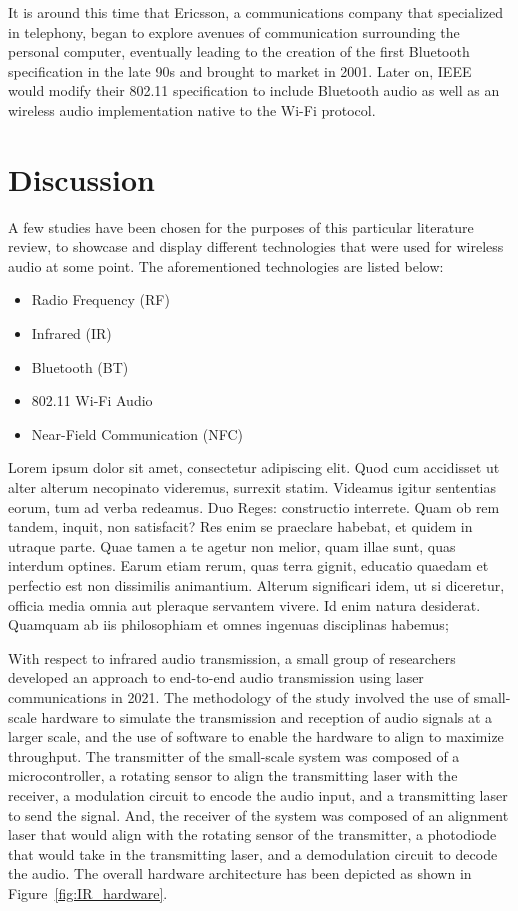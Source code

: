 \documentclass[conference]{IEEEtran}
\begin{document}
It is around this time that Ericsson, a communications company that specialized in telephony,
began to explore avenues of communication surrounding the personal computer, eventually
leading to the creation of the first Bluetooth specification in the late 90s and brought to
market in 2001.\cite{irekvist_bluetooth_2022} Later on, IEEE would modify their 802.11
specification to include Bluetooth audio as well as an wireless audio implementation native
to the Wi-Fi protocol.\cite{noauthor_bluetooth_nodate}

\section*{Discussion}

A few studies have been chosen for the purposes of this particular literature review, to
showcase and display different technologies that were used for wireless audio at some point.
The aforementioned technologies are listed below:

\begin{itemize}
    \item Radio Frequency (RF)
    \item Infrared (IR)
    \item Bluetooth (BT)
    \item 802.11 Wi-Fi Audio
    \item Near-Field Communication (NFC)
\end{itemize}

Lorem ipsum dolor sit amet, consectetur adipiscing elit. Quod cum accidisset ut alter alterum
necopinato videremus, surrexit statim. Videamus igitur sententias eorum, tum ad verba
redeamus. Duo Reges: constructio interrete. Quam ob rem tandem, inquit, non satisfacit? Res
enim se praeclare habebat, et quidem in utraque parte. Quae tamen a te agetur non melior,
quam illae sunt, quas interdum optines. Earum etiam rerum, quas terra gignit, educatio
quaedam et perfectio est non dissimilis animantium. Alterum significari idem, ut si
diceretur, officia media omnia aut pleraque servantem vivere. Id enim natura desiderat.
Quamquam ab iis philosophiam et omnes ingenuas disciplinas habemus;

With respect to infrared audio transmission, a small group of researchers developed an
approach to end-to-end audio transmission using laser communications in 2021. The methodology
of the study involved the use of small-scale hardware to simulate the transmission and
reception of audio signals at a larger scale, and the use of software to enable the hardware
to align to maximize throughput. The transmitter of the small-scale system was composed of a
microcontroller, a rotating sensor to align the transmitting laser with the receiver, a
modulation circuit to encode the audio input, and a transmitting laser to send the signal.
And, the receiver of the system was composed of an alignment laser that would align with the
rotating sensor of the transmitter, a photodiode that would take in the transmitting laser,
and a demodulation circuit to decode the audio. The overall hardware architecture has been
depicted as shown in Figure~\ref{fig:IR_hardware}.\cite{anthony_approach_2021}
\end{document}
